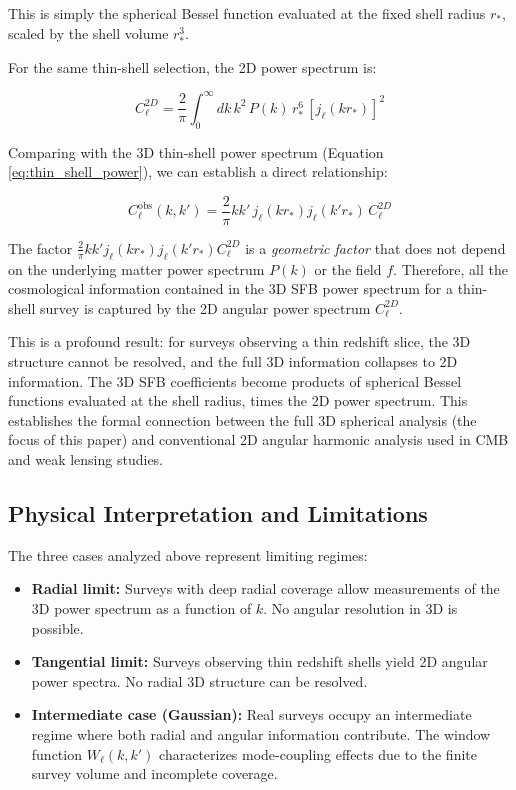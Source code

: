 This is simply the spherical Bessel function evaluated at the fixed shell radius $r_*$, scaled by the shell volume $r_*^3$.

For the same thin-shell selection, the 2D power spectrum is:

\begin{equation}
C_\ell^{2D} = \frac{2}{\pi} \int_0^\infty dk \, k^2 \, P(k) \, r_*^6 \, \left[ j_\ell(k r_*) \right]^2
\label{eq:thin_shell_2d_cl}
\end{equation}

Comparing with the 3D thin-shell power spectrum (Equation \ref{eq:thin_shell_power}), we can establish a direct relationship:

\begin{equation}
C_\ell^{\text{obs}}(k, k') = \frac{2}{\pi} k k' \, j_\ell(k r_*) j_\ell(k' r_*) \, C_\ell^{2D}
\label{eq:3d_2d_relation}
\end{equation}

The factor $\frac{2}{\pi} k k' j_\ell(k r_*) j_\ell(k' r_*) C_\ell^{2D}$ is a \emph{geometric factor} that does not depend on the underlying matter power spectrum $P(k)$ or the field $f$. Therefore, all the cosmological information contained in the 3D SFB power spectrum for a thin-shell survey is captured by the 2D angular power spectrum $C_\ell^{2D}$.

This is a profound result: for surveys observing a thin redshift slice, the 3D structure cannot be resolved, and the full 3D information collapses to 2D information. The 3D SFB coefficients become products of spherical Bessel functions evaluated at the shell radius, times the 2D power spectrum. This establishes the formal connection between the full 3D spherical analysis (the focus of this paper) and conventional 2D angular harmonic analysis used in CMB and weak lensing studies.

\subsection{Physical Interpretation and Limitations}

The three cases analyzed above represent limiting regimes:

\begin{itemize}
\item \textbf{Radial limit:} Surveys with deep radial coverage allow measurements of the 3D power spectrum as a function of $k$. No angular resolution in 3D is possible.
\item \textbf{Tangential limit:} Surveys observing thin redshift shells yield 2D angular power spectra. No radial 3D structure can be resolved.
\item \textbf{Intermediate case (Gaussian):} Real surveys occupy an intermediate regime where both radial and angular information contribute. The window function $W_\ell(k, k')$ characterizes mode-coupling effects due to the finite survey volume and incomplete coverage.
\end{itemize}

